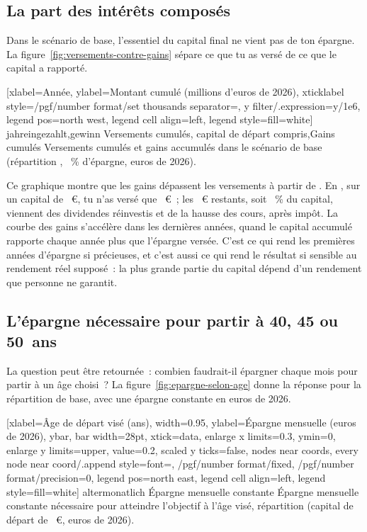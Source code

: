 \subsection{La part des int\'er\^ets compos\'es}\label{sec:accu-interets}

Dans le sc\'enario de base, l'essentiel du capital final ne vient pas de ton \'epargne. La
figure~\ref{fig:versements-contre-gains} s\'epare ce que tu as vers\'e de ce que le capital a
rapport\'e.

[xlabel={Ann\'ee}, ylabel={Montant cumul\'e (millions d'euros de 2026)},
  xticklabel style={/pgf/number format/set thousands separator={}},
  y filter/.expression={y/1e6}, legend pos=north west, legend cell align=left, legend style={fill=white}]%
  {jahr}{eingezahlt,gewinn}%
  {{Versements cumul\'es, capital de d\'epart compris},{Gains cumul\'es}}%
  {Versements cumul\'es et gains accumul\'es dans le sc\'enario de base (r\'epartition
  \ReferenzStrategie, \ReferenzSparquote~\% d'\'epargne, euros de 2026).\label{fig:versements-contre-gains}}

Ce graphique montre que les gains d\'epassent les versements \`a partir de \ZinsAnneeBascule. En
\AnneeYannBasis, sur un capital de \KapitalYannBasis~€, tu n'as vers\'e que \ZinsVersements~€~; les
\ZinsGains~€ restants, soit \ZinsPartGains~\% du capital, viennent des dividendes r\'einvestis et de la
hausse des cours, apr\`es imp\^ot. La courbe des gains s'acc\'el\`ere dans les derni\`eres ann\'ees,
quand le capital accumul\'e rapporte chaque ann\'ee plus que l'\'epargne vers\'ee. C'est ce qui rend
les premi\`eres ann\'ees d'\'epargne si pr\'ecieuses, et c'est aussi ce qui rend le r\'esultat si
sensible au rendement r\'eel suppos\'e~: la plus grande partie du capital d\'epend d'un rendement que
personne ne garantit.

\subsection{L'\'epargne n\'ecessaire pour partir \`a 40, 45 ou 50~ans}\label{sec:accu-besoin}

La question peut \^etre retourn\'ee~: combien faudrait-il \'epargner chaque mois pour partir \`a un
\^age choisi~? La figure~\ref{fig:epargne-selon-age} donne la r\'eponse pour la r\'epartition de base,
avec une \'epargne constante en euros de 2026.

[xlabel={\^Age de d\'epart vis\'e (ans)},
  width=0.95\linewidth, ylabel={\'Epargne mensuelle (euros de 2026)}, ybar, bar width=28pt, xtick=data,
  enlarge x limits=0.3, ymin=0, enlarge y limits={upper, value=0.2}, scaled y ticks=false,
  nodes near coords, every node near coord/.append style={font=\scriptsize,
    /pgf/number format/fixed, /pgf/number format/precision=0}, legend pos=north east, legend cell align=left, legend style={fill=white}]%
  {alter}{monatlich}%
  {{\'Epargne mensuelle constante}}%
  {\'Epargne mensuelle constante n\'ecessaire pour atteindre l'objectif \`a l'\^age vis\'e,
  r\'epartition \ReferenzStrategie{} (capital de d\'epart de \KapitalDepartMitte~€, euros de
  2026).\label{fig:epargne-selon-age}}


